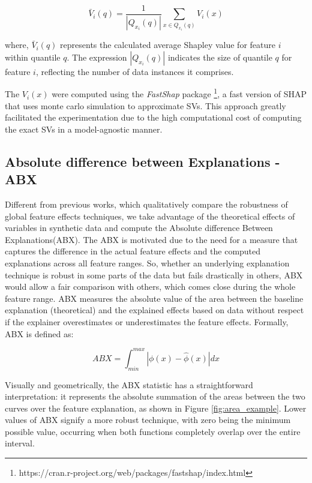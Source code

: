 \begin{equation}
\bar{V}_{i}(q) = \frac{1}{|Q_{x_i}(q)|} \sum_{x \in Q_{x_i}(q)} V_i(x)
\label{gridShap}
\end{equation}

where, \(\bar{V}_{i}(q)\) represents the calculated average Shapley value for feature \(i\) within quantile \(q\). The expression \(|Q_{x_i}(q)|\) indicates the size of quantile \(q\) for feature \(i\), reflecting the number of data instances it comprises. 

The \(V_i(x)\) were computed using the \textit{FastShap} package \footnote{https://cran.r-project.org/web/packages/fastshap/index.html}, a fast version of \gls{SHAP} that uses monte carlo simulation to approximate SVs. This approach greatly facilitated the experimentation due to the high computational cost of computing the exact SVs in a model-agnostic manner. 

\subsection{Absolute difference between Explanations - ABX}

Different from previous works, which qualitatively compare the robustness of global feature effects techniques, we take advantage of the theoretical effects of variables in synthetic data and compute the Absolute difference Between Explanations(ABX). The \gls{ABX} is motivated due to the need for a measure that captures the difference in the actual feature effects and the computed explanations across all feature ranges. So, whether an underlying explanation technique is robust in some parts of the data but fails drastically in others, \gls{ABX} would allow a fair comparison with others, which comes close during the whole feature range. \gls{ABX} measures the absolute value of the area between the baseline explanation (theoretical) and the explained effects based on data without respect if the explainer overestimates or underestimates the feature effects. Formally, \gls{ABX} is defined as:

\begin{equation}
ABX = \int_{min}^{max} |\phi(x) - \hat{\phi}(x)| dx
\label{abx}
\end{equation}

Visually and geometrically, the \gls{ABX} statistic has a straightforward interpretation: it represents the absolute summation of the areas between the two curves over the feature explanation, as shown in Figure \ref{fig:area_example}.  Lower values of \gls{ABX} signify a more robust technique, with zero being the minimum possible value, occurring when both functions completely overlap over the entire interval.

